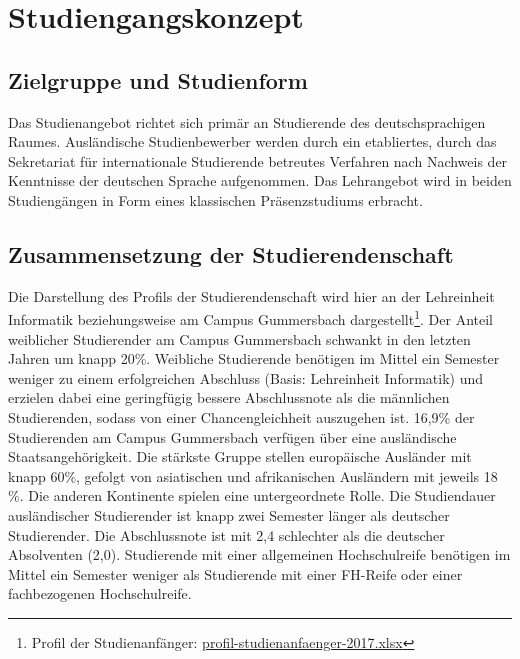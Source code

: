 \chapter{Studiengangskonzept}\label{studiengangskonzept}

\section{Zielgruppe und
Studienform}\label{zielgruppe-und-studienform}

Das Studienangebot richtet sich primär an Studierende des
deutschsprachigen Raumes. Ausländische Studienbewerber werden durch ein
etabliertes, durch das Sekretariat für internationale Studierende
betreutes Verfahren nach Nachweis der Kenntnisse der deutschen Sprache
aufgenommen. Das Lehrangebot wird in beiden Studiengängen in Form eines
klassischen Präsenzstudiums erbracht.

\section{Zusammensetzung der
Studierendenschaft}\label{zusammensetzung-der-studierendenschaft}

Die Darstellung des Profils der Studierendenschaft wird hier an der
Lehreinheit Informatik beziehungsweise am Campus Gummersbach
dargestellt\footnote{Profil der Studienanfänger:
  \href{https://th-koeln.github.io/mi-2017/anhaenge/profil-studienanfaenger-2017.xlsx}{profil-studienanfaenger-2017.xlsx}}.
Der Anteil weiblicher Studierender am Campus Gummersbach schwankt in den
letzten Jahren um knapp 20\%. Weibliche Studierende benötigen im Mittel
ein Semester weniger zu einem erfolgreichen Abschluss (Basis:
Lehreinheit Informatik) und erzielen dabei eine geringfügig bessere
Abschlussnote als die männlichen Studierenden, sodass von einer
Chancengleichheit auszugehen ist. 16,9\% der Studierenden am Campus
Gummersbach verfügen über eine ausländische Staatsangehörigkeit. Die
stärkste Gruppe stellen europäische Ausländer mit knapp 60\%, gefolgt
von asiatischen und afrikanischen Ausländern mit jeweils 18 \%. Die
anderen Kontinente spielen eine untergeordnete Rolle. Die Studiendauer
ausländischer Studierender ist knapp zwei Semester länger als deutscher
Studierender. Die Abschlussnote ist mit 2,4 schlechter als die deutscher
Absolventen (2,0). Studierende mit einer allgemeinen Hochschulreife
benötigen im Mittel ein Semester weniger als Studierende mit einer
FH-Reife oder einer fachbezogenen Hochschulreife.

